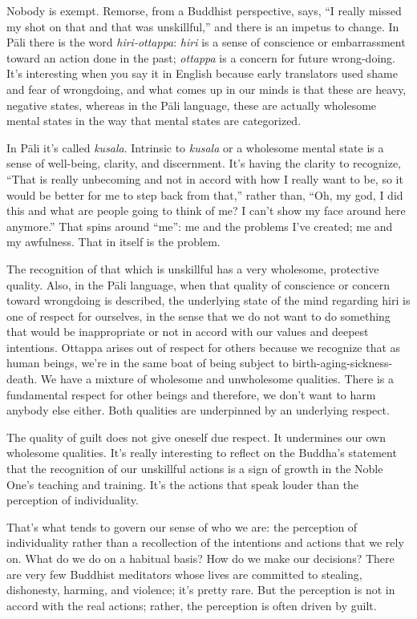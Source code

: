 Nobody is exempt. Remorse, from a Buddhist perspective, says, “I really
missed my shot on that and that was unskillful,” and there is an impetus
to change. In Pāli there is the word \emph{hiri-ottappa}: \emph{hiri} is
a sense of conscience or embarrassment toward an action done in the
past; \emph{ottappa} is a concern for future wrong-doing. It’s
interesting when you say it in English because early translators used
shame and fear of wrongdoing, and what comes up in our minds is that
these are heavy, negative states, whereas in the Pāli language, these
are actually wholesome mental states in the way that mental states are
categorized.

In Pāli it’s called \emph{kusala}. Intrinsic to \emph{kusala} or a
wholesome mental state is a sense of well-being, clarity, and
discernment. It’s having the clarity to recognize, “That is really
unbecoming and not in accord with how I really want to be, so it would
be better for me to step back from that,” rather than, “Oh, my god, I
did this and what are people going to think of me? I can’t show my face
around here anymore.” That spins around “me”: me and the problems I’ve
created; me and my awfulness. That in itself is the problem.

The recognition of that which is unskillful has a very wholesome,
protective quality. Also, in the Pāli language, when that quality of
conscience or concern toward wrongdoing is described, the underlying
state of the mind regarding hiri is one of respect for ourselves, in the
sense that we do not want to do something that would be inappropriate or
not in accord with our values and deepest intentions. Ottappa arises out
of respect for others because we recognize that as human beings, we’re
in the same boat of being subject to birth-aging-sickness-death. We have
a mixture of wholesome and unwholesome qualities. There is a fundamental
respect for other beings and therefore, we don’t want to harm anybody
else either. Both qualities are underpinned by an underlying respect.

The quality of guilt does not give oneself due respect. It undermines
our own wholesome qualities. It’s really interesting to reflect on the
Buddha’s statement that the recognition of our unskillful actions is a
sign of growth in the Noble One’s teaching and training. It’s the
actions that speak louder than the perception of individuality.

That’s what tends to govern our sense of who we are: the perception of
individuality rather than a recollection of the intentions and actions
that we rely on. What do we do on a habitual basis? How do we make our
decisions? There are very few Buddhist meditators whose lives are
committed to stealing, dishonesty, harming, and violence; it’s pretty
rare. But the perception is not in accord with the real actions; rather,
the perception is often driven by guilt.

